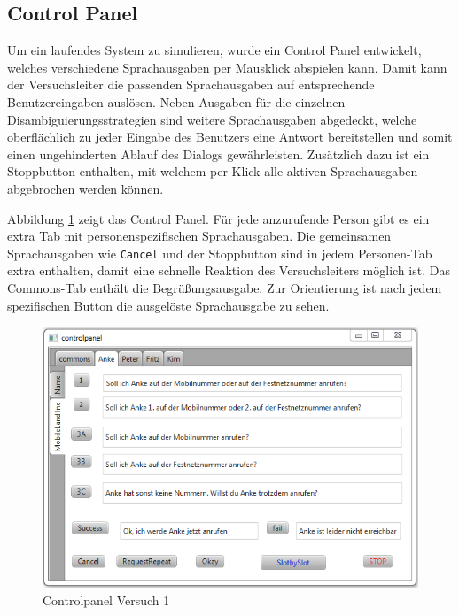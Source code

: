 \documentclass[12pt,a4paper]{scrartcl}
\begin{document}
\subsection{Control Panel}
\label{ControlPanel}
Um ein laufendes System zu simulieren, wurde ein Control Panel entwickelt, welches verschiedene Sprachausgaben per Mausklick abspielen kann. Damit kann der Versuchsleiter die passenden Sprachausgaben auf entsprechende Benutzereingaben auslösen. Neben Ausgaben für die einzelnen Disambiguierungsstrategien sind weitere Sprachausgaben abgedeckt, welche oberflächlich zu jeder Eingabe des Benutzers eine Antwort bereitstellen und somit einen ungehinderten Ablauf des Dialogs gewährleisten. Zusätzlich dazu ist ein Stoppbutton enthalten, mit welchem per Klick alle aktiven Sprachausgaben abgebrochen werden können. 

Abbildung \ref{cp1} zeigt das Control Panel. Für jede anzurufende Person gibt es ein extra Tab mit personenspezifischen Sprachausgaben. Die gemeinsamen Sprachausgaben wie \texttt{Cancel} und der Stoppbutton sind in jedem Personen-Tab extra enthalten, damit eine schnelle Reaktion des Versuchsleiters möglich ist. Das Commons-Tab enthält die Begrüßungsausgabe. Zur Orientierung ist nach jedem spezifischen Button die ausgelöste Sprachausgabe zu sehen. 
\begin{figure}[htbp]
\includegraphics[width=13cm]{controlpanel.png}
\caption{Controlpanel Versuch 1}
\label{cp1}
\end{figure}
\end{document}
